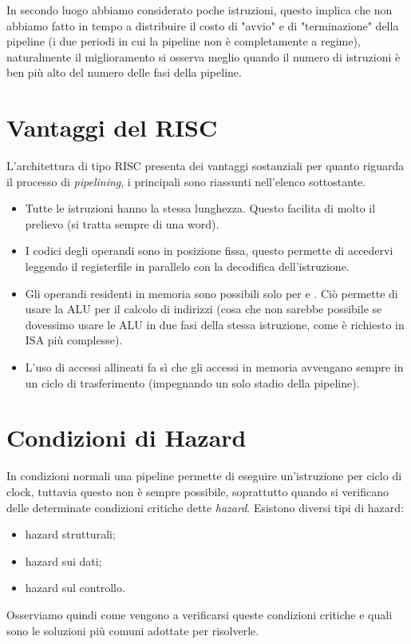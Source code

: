 \documentclass[class=book, crop=false, oneside]{standalone}
\begin{document}
In secondo luogo abbiamo considerato poche istruzioni, questo implica che non abbiamo fatto in tempo a distribuire il costo di "avvio" e di "terminazione" della pipeline (i due periodi in cui la pipeline non è completamente a regime), naturalmente il miglioramento si osserva meglio quando il numero di istruzioni è ben più alto del numero delle fasi della pipeline.

\section{Vantaggi del RISC}
L'architettura di tipo RISC presenta dei vantaggi sostanziali per quanto riguarda il processo di \emph{pipelining}, i principali sono riassunti nell'elenco sottostante.
\begin{itemize}
	\item Tutte le istruzioni hanno la stessa lunghezza. Questo facilita di molto il prelievo (si tratta sempre di una word).
	\item I codici degli operandi sono in posizione fissa, questo permette di accedervi leggendo il registerfile in parallelo con la decodifica dell’istruzione.
	\item Gli operandi residenti in memoria sono possibili solo per  e . Ciò permette di usare la ALU per il calcolo di indirizzi (cosa che non sarebbe possibile se dovessimo usare le ALU in due fasi della stessa istruzione, come è richiesto in ISA più complesse).
	\item  L’uso di accessi allineati fa sì che gli accessi in memoria avvengano sempre in un ciclo di trasferimento (impegnando un solo stadio della pipeline).
\end{itemize}

\section{Condizioni di Hazard}
In condizioni normali una pipeline permette di eseguire un'istruzione per ciclo di clock, tuttavia questo non è sempre possibile, soprattutto quando si verificano delle determinate condizioni critiche dette \emph{hazard}.
Esistono diversi tipi di hazard:
\begin{itemize}
	\item hazard strutturali;
	\item hazard sui dati;
	\item hazard sul controllo.
\end{itemize}
Osserviamo quindi come vengono a verificarsi queste condizioni critiche e quali sono le soluzioni più comuni adottate per risolverle.
\end{document}
